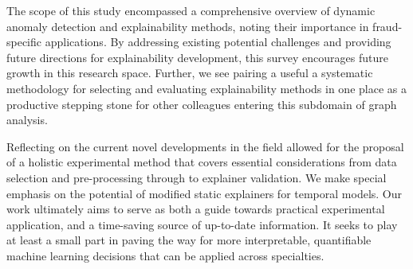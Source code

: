 The scope of this study encompassed a comprehensive overview of dynamic anomaly detection and explainability methods, noting their importance in fraud-specific applications. By addressing existing potential challenges and providing future directions for explainability development, this survey encourages future growth in this research space. Further, we see pairing a useful a systematic methodology for selecting and evaluating explainability methods in one place as a productive stepping stone for other colleagues entering this subdomain of graph analysis.

Reflecting on the current novel developments in the field allowed for the proposal of a holistic experimental method that covers essential considerations from data selection and pre-processing through to explainer validation. We make special emphasis on the potential of modified static explainers for temporal models. Our work ultimately aims to serve as both a guide towards practical experimental application, and a time-saving source of up-to-date information. It seeks to play at least a small part in paving the way for more interpretable, quantifiable machine learning decisions that can be applied across specialties.